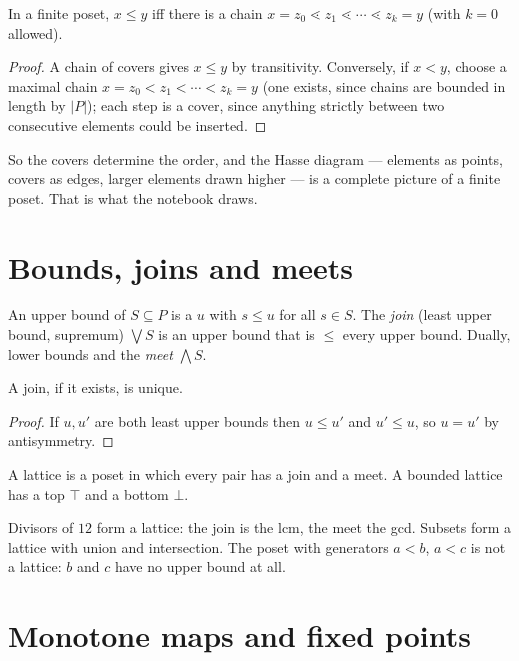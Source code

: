 \begin{theorem}
  In a finite poset, $x \le y$ iff there is a chain $x = z_0 \lessdot z_1 \lessdot \cdots \lessdot
  z_k = y$ (with $k = 0$ allowed).
\end{theorem}
\begin{proof}
  A chain of covers gives $x \le y$ by transitivity. Conversely, if $x < y$, choose a maximal
  chain $x = z_0 < z_1 < \cdots < z_k = y$ (one exists, since chains are bounded in length by
  $|P|$); each step is a cover, since anything strictly between two consecutive elements could be
  inserted.
\end{proof}

So the covers determine the order, and the Hasse diagram --- elements as points, covers as edges,
larger elements drawn higher --- is a complete picture of a finite poset. That is what the
notebook draws.

\section{Bounds, joins and meets}

\begin{definition}
  An upper bound of $S \subseteq P$ is a $u$ with $s \le u$ for all $s \in S$. The \emph{join}
  (least upper bound, supremum) $\bigvee S$ is an upper bound that is $\le$ every upper bound.
  Dually, lower bounds and the \emph{meet} $\bigwedge S$.
\end{definition}

\begin{theorem}
  A join, if it exists, is unique.
\end{theorem}
\begin{proof}
  If $u, u'$ are both least upper bounds then $u \le u'$ and $u' \le u$, so $u = u'$ by antisymmetry.
\end{proof}

\begin{definition}
  A lattice is a poset in which every pair has a join and a meet. A bounded lattice has a top
  $\top$ and a bottom $\bot$.
\end{definition}

Divisors of $12$ form a lattice: the join is the lcm, the meet the gcd. Subsets form a lattice
with union and intersection. The poset with generators $a < b$, $a < c$ is not a lattice: $b$ and
$c$ have no upper bound at all.

\section{Monotone maps and fixed points}


